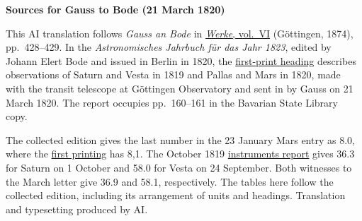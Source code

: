 \clearpage\thispagestyle{empty}
\begin{center}\textbf{Sources for Gauss to Bode (21 March 1820)}\end{center}
\noindent This AI translation follows \textit{Gauss an Bode} in \href{https://gdz.sub.uni-goettingen.de/id/PPN236007467}{\textit{Werke}, vol.~VI} (Göttingen, 1874), pp.~428--429. In the \textit{Astronomisches Jahrbuch für das Jahr 1823}, edited by Johann Elert Bode and issued in Berlin in 1820, the \href{https://api.digitale-sammlungen.de/iiif/image/v2/bsb10538352_00166/full/1600,/0/default.jpg}{first-print heading} describes observations of Saturn and Vesta in 1819 and Pallas and Mars in 1820, made with the transit telescope at Göttingen Observatory and sent in by Gauss on 21 March 1820. The report occupies pp.~160--161 in the Bavarian State Library copy.
\par\smallskip\noindent The collected edition gives the last number in the 23 January Mars entry as 8.0, where the \href{https://api.digitale-sammlungen.de/iiif/image/v2/bsb10538352_00167/full/1600,/0/default.jpg}{first printing} has 8,1. The October 1819 \hyperlink{native-427-part-lower}{instruments report} gives 36.3 for Saturn on 1 October and 58.0 for Vesta on 24 September. Both witnesses to the March letter give 36.9 and 58.1, respectively. The tables here follow the collected edition, including its arrangement of units and headings. Translation and typesetting produced by AI.
\clearpage
